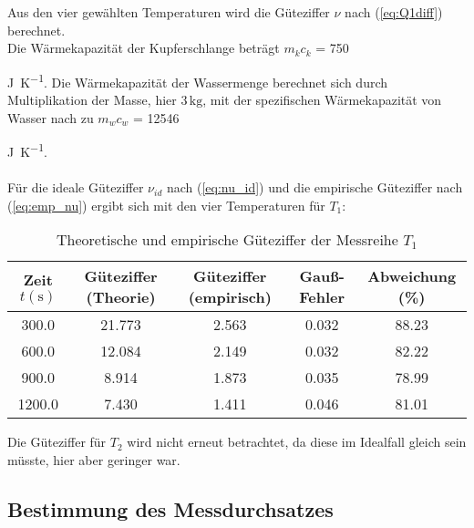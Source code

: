 
Aus den vier gewählten Temperaturen wird die Güteziffer $\nu$ nach (\ref{eq:Q1diff}) berechnet.
\\
Die Wärmekapazität der Kupferschlange beträgt $m_{k} c_{k}$ = 750 {\unit[per-mode=fraction]{\joule\per\kelvin}. 
Die Wärmekapazität der Wassermenge berechnet sich durch Multiplikation der Masse, hier $3\,\unit{\kilo\gram}$, mit der spezifischen %
Wärmekapazität von Wasser nach \cite[278]{demtroeder1} zu $m_{w} c_{w}$ = 12546 {\unit[per-mode=fraction]{\joule\per\kelvin}. \\
\\
Für die ideale Güteziffer $\nu_{id}$ nach (\ref{eq:nu_id}) und die empirische Güteziffer nach (\ref{eq:emp_nu})
ergibt sich mit den vier Temperaturen für $T_{1}$:

\begin{table}
  \centering
  \caption{Theoretische und empirische Güteziffer der Messreihe $T_{1}$}
  \label{tab:güteziffern_t1}
  \begin{tabular}{c c c c c}
    \toprule
    {Zeit $t (\unit{\second})$} &
    Güteziffer (Theorie) &
    Güteziffer (empirisch) &
    Gauß-Fehler &
    Abweichung (\%) \\
    \midrule
     300.0 &                21.773 &                   2.563 &        0.032 &           88.23 \\
     600.0 &                12.084 &                   2.149 &        0.032 &           82.22 \\
     900.0 &                 8.914 &                   1.873 &        0.035 &           78.99 \\
    1200.0 &                 7.430 &                   1.411 &        0.046 &           81.01 \\
    \bottomrule
    \end{tabular}
\end{table}

Die Güteziffer für $T_{2}$ wird nicht erneut betrachtet, da diese im Idealfall gleich sein
müsste, hier aber geringer war. \\

\subsection{Bestimmung des Messdurchsatzes}

}}
